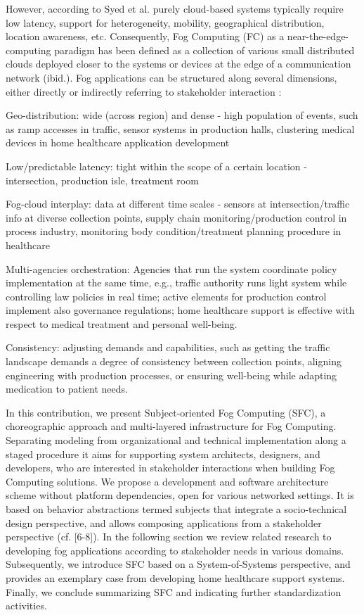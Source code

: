 However, according to Syed et al. \cite{article:FogPattern} purely cloud-based systems typically require low latency, support for heterogeneity, mobility, geographical distribution, location awareness, etc. Consequently, Fog Computing (FC) as a near-the-edge-computing paradigm has been defined as a collection of various small distributed clouds deployed closer to the systems or devices at the edge of a communication network (ibid.). Fog applications can be structured along several dimensions, either directly or indirectly referring to stakeholder interaction \cite{article:OoTAnalytics}:
\begin{list}{-}{spacing}
	\item Geo-distribution: wide (across region) and dense - high population of events, such as ramp accesses in traffic, sensor systems in production halls, clustering medical devices in home healthcare application development
	\item Low/predictable latency: tight within the scope of a certain location - intersection, production isle, treatment room
	\item Fog-cloud interplay: data at different time scales - sensors at intersection/traffic info at diverse collection points, supply chain monitoring/production control in process industry, monitoring body condition/treatment planning procedure in healthcare
	\item Multi-agencies orchestration: Agencies that run the system coordinate policy implementation at the same time, e.g., traffic authority runs light system while controlling law policies in real time; active elements for production control implement also governance regulations; home healthcare support is effective with respect to medical treatment and personal well-being.
	\item Consistency: adjusting demands and capabilities, such as getting the traffic landscape demands a degree of consistency between collection points, aligning engineering with production processes, or ensuring well-being while adapting medication to patient needs.
\end{list}

In this contribution, we present Subject-oriented Fog Computing (SFC), a choreographic approach and multi-layered infrastructure for Fog Computing. Separating modeling from organizational and technical implementation along a staged procedure it aims for supporting system architects, designers, and developers, who are interested in stakeholder interactions when building Fog Computing solutions. We propose a development and software architecture scheme without platform dependencies, open for various networked settings. It is based on behavior abstractions termed subjects that integrate a socio-technical design perspective, and allows composing applications from a stakeholder perspective (cf. [6-8]).
In the following section we review related research to developing fog applications according to stakeholder needs in various domains. Subsequently, we introduce SFC based on a System-of-Systems perspective, and provides an exemplary case from developing home healthcare support systems. Finally, we conclude summarizing SFC and indicating further standardization activities.

